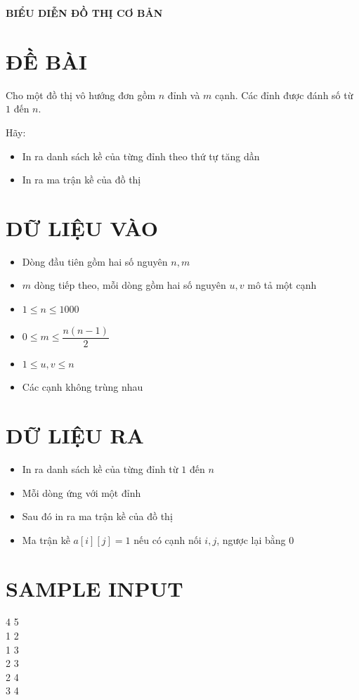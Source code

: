 \documentclass[a4paper,12pt]{article}
\begin{document}
\begin{center}
    \textbf{\Large BIỂU DIỄN ĐỒ THỊ CƠ BẢN}
\end{center}

\section*{ĐỀ BÀI}
Cho một đồ thị vô hướng đơn gồm $n$ đỉnh và $m$ cạnh. Các đỉnh được đánh số từ $1$ đến $n$.

Hãy:
\begin{itemize}
    \item In ra danh sách kề của từng đỉnh theo thứ tự tăng dần
    \item In ra ma trận kề của đồ thị
\end{itemize}

\section*{DỮ LIỆU VÀO}
\begin{itemize}
    \item Dòng đầu tiên gồm hai số nguyên $n, m$
    \item $m$ dòng tiếp theo, mỗi dòng gồm hai số nguyên $u, v$ mô tả một cạnh
    \item $1 \le n \le 1000$
    \item $0 \le m \le \dfrac{n(n-1)}{2}$
    \item $1 \le u, v \le n$
    \item Các cạnh không trùng nhau
\end{itemize}

\section*{DỮ LIỆU RA}
\begin{itemize}
    \item In ra danh sách kề của từng đỉnh từ $1$ đến $n$
    \item Mỗi dòng ứng với một đỉnh
    \item Sau đó in ra ma trận kề của đồ thị
    \item Ma trận kề $a[i][j] = 1$ nếu có cạnh nối $i, j$, ngược lại bằng $0$
\end{itemize}

\section*{SAMPLE INPUT}
\begin{tcolorbox}
4 5 \\
1 2 \\
1 3 \\
2 3 \\
2 4 \\
3 4
\end{tcolorbox}
\end{document}
